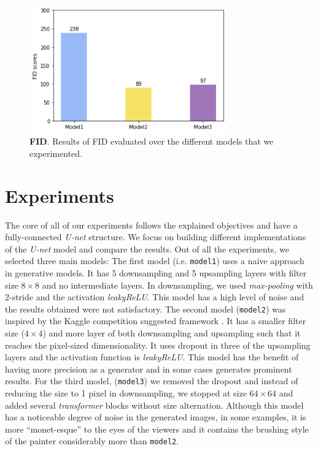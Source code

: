 \documentclass[10pt,twocolumn,letterpaper]{article}
\begin{document}
\begin{figure}
	\includegraphics[width=23em]{fid.png}
	\caption{\textbf{FID}. Results of FID evaluated over the different models that we experimented.}
	\label{figure:fid}
\end{figure}

\section{Experiments}
The core of all of our experiments follows the explained objectives and have a fully-connected \textit{U-net} structure. We focus on building different implementations of the \textit{U-net} model and compare the results. Out of all the experiments, we selected three main models: The first model (i.e. \texttt{model1}) uses a naive approach in generative models. It has 5 downsampling and 5 upsampling layers with filter size $8 \times 8$ and no intermediate layers. In downsampling, we used \textit{max-pooling} with 2-stride and the activation \textit{leakyReLU}. This model has a high level of noise and the results obtained were not satisfactory. The second model (\texttt{model2}) was inspired by the Kaggle competition suggested framework \cite{kaggle}. It has a smaller filter size ($4 \times 4$) and more layer of both downsampling and upsampling such that it reaches the pixel-sized dimensionality. It uses dropout in three of the upsampling layers and the activation function is \textit{leakyReLU}. This model has the benefit of having more precision as a generator and in some cases generates prominent results. For the third model, (\texttt{model3}) we removed the dropout and instead of reducing the size to 1 pixel in downsampling, we stopped at size $64 \times 64$ and added several \textit{transformer} blocks without size alternation. Although this model has a noticeable degree of noise in the generated images, in some examples, it is more “monet-esque” to the eyes of the viewers and it contains the brushing style of the painter considerably more than \texttt{model2}.
\end{document}
